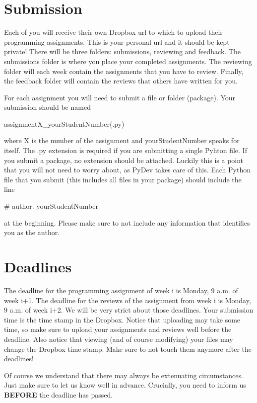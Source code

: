 \documentclass[a4paper, leqno, 11pt]{article}
\begin{document}
\section{Submission} \label{submission}
Each of you will receive their own Dropbox url to which to upload their programming assignments. This is your personal url and it should
be kept private! There will be three folders: submissions, reviewing and feedback. The submissions folder is where you place your
completed assignments. The reviewing folder will each week contain the assignments that you have to review. Finally, the feedback
folder will contain the reviews that others have written for you.

For each assignment you will need to submit a file or folder (package). Your submission should be named
\begin{center}
assignmentX\_yourStudentNumber(.py)
\end{center}
where X is the number of the assignment and yourStudentNumber speaks for itself. The .py extension is required if you are submitting a
single Pyhton file. If you submit a package, no extension should be attached. Luckily this is a point that you will not need 
to worry about, as PyDev takes care of this. Each Python file that you submit (this includes all files in your package) should
include the line
\begin{center}
\# author: yourStudentNumber
\end{center}
at the beginning. Please make sure to not include any information that identifies you as the author.

\section{Deadlines}
The deadline for the programming assignment of week i is Monday, 9 a.m. of week i+1. The deadline for the reviews of the assignment
from week i is Monday, 9 a.m. of week i+2. We will be very strict about those deadlines. Your submission time is the time stamp in
the Dropbox. Notice that uploading may take some time, so make sure to upload your assignments and reviews well before the deadline.
Also notice that viewing (and of course modifying) your files may change the Dropbox time stamp. Make sure to not touch them anymore
after the deadlines!

Of course we understand that there may always be extenuating circumstances. Just make sure to let us know well in advance. Crucially,
you need to inform us \textbf{BEFORE} the deadline has passed.
\end{document}
